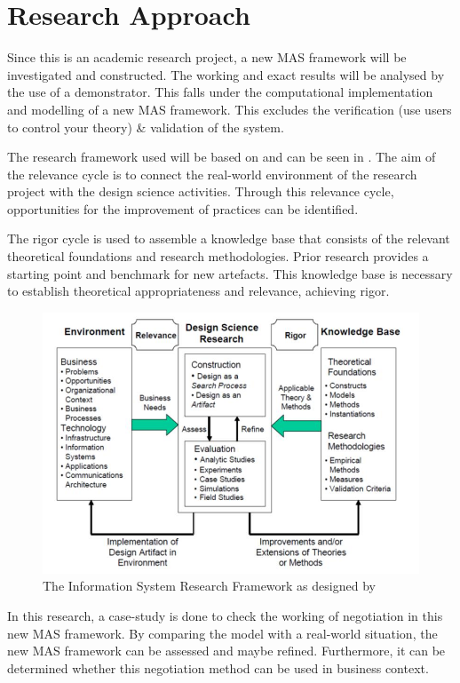 \section{Research Approach}
Since this is an academic research project, a new MAS framework will be investigated and constructed. The working and exact results will be analysed by the use of a demonstrator. This falls under the computational implementation and modelling of a new MAS framework. This excludes the verification (use users to control your theory) \& validation of the system.  

The research framework used will be based on \cite{hevner2010design} and can be seen in . The aim of the relevance cycle is to connect the real-world environment of the research project with the design science activities. Through this relevance cycle, opportunities for the improvement of practices can be identified.

The rigor cycle is used to assemble a knowledge base that consists of the relevant theoretical foundations and research methodologies. Prior research provides a starting point and benchmark for new artefacts. This knowledge base is necessary to establish theoretical appropriateness and relevance, achieving rigor.

\begin{figure}
	\centering
	\includegraphics[width=0.7\linewidth]{./img/InformationSystemResearchFramework.jpg}
	\caption{The Information System Research Framework as designed by \citet{hevner2010design}}
	\label{fig:InformationSystemResearchFramework}
\end{figure}

In this research, a case-study is done to check the working of negotiation in this new MAS framework. By comparing the model with a real-world situation, the new MAS framework can be assessed and maybe refined. Furthermore, it can be determined whether this negotiation method can be used in business context.

